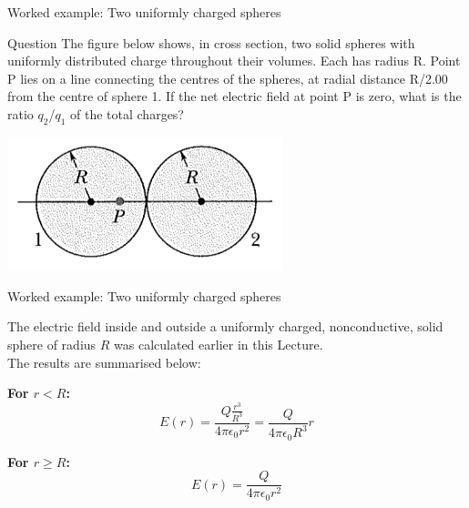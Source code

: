 
%
%

{
\problemslide

%
%
%

\begin{frame}{Worked example: Two uniformly charged spheres}

  \begin{blockexmplque}{Question}
    The figure below shows, in cross section, two solid spheres with uniformly
  	distributed charge throughout their volumes. Each has radius R.
  	Point P lies on a line connecting the centres of the spheres, at radial distance
  	R/2.00 from the centre of sphere 1.
  	If the net electric field at point P is zero, what is the ratio $q_2$/$q_1$
  	of the total charges?
    \begin{center}
      \includegraphics[width=0.60\textwidth]{./images/problems/lect02_2_charged_spheres}
    \end{center}
  \end{blockexmplque}

\end{frame}

%
%
%

\begin{frame}{Worked example: Two uniformly charged spheres}

  The electric field inside and outside a uniformly charged, nonconductive,
  solid sphere of radius $R$ was calculated earlier in this Lecture.\\
  \vspace{0.1cm}
  The results are summarised below:

  {\bf For $r < R$:}
  \begin{equation*}
     E(r) = \frac{Q \frac{r^3}{R^3}}{4 \pi \epsilon_0 r^2} =
      \frac{Q}{4 \pi \epsilon_0 R^3} r
  \end{equation*}

  {\bf For $r \ge R$:}
  \begin{equation*}
     E(r) = \frac{Q}{4 \pi \epsilon_0 r^2}
  \end{equation*}


\end{frame}}
